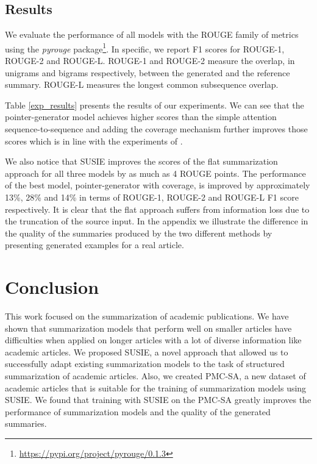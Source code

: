 \documentclass[runningheads]{llncs}
\begin{document}
\subsection{Results}

We evaluate the performance of all models with the ROUGE family of metrics~\cite{Lin2004Rouge:Summaries} using the {\em pyrouge} package\footnote{\url{https://pypi.org/project/pyrouge/0.1.3}}. In specific, we report F1 scores for ROUGE-1, ROUGE-2 and ROUGE-L. ROUGE-1 and ROUGE-2 measure the overlap, in unigrams and bigrams respectively, between the generated and the reference summary. ROUGE-L measures the longest common subsequence overlap.


Table \ref{exp_results} presents the results of our experiments. We can see that the pointer-generator model achieves higher scores than the simple attention sequence-to-sequence and adding the coverage mechanism further improves those scores which is in line with the experiments of \cite{See2017GetNetworks}. 

We also notice that SUSIE improves the scores of the flat summarization approach for all three models by as much as 4 ROUGE points. The performance of the best model, pointer-generator with coverage, is improved by approximately 13\%, 28\% and 14\% in terms of ROUGE-1, ROUGE-2 and ROUGE-L F1 score respectively. It is clear that the flat approach suffers from information loss due to the truncation of the source input.  
In the appendix we illustrate the difference in the quality of the summaries produced by the two different methods by presenting generated examples for a real article. 

\section{Conclusion}

This work focused on the summarization of academic publications. We have shown that summarization models that perform well on smaller articles have difficulties when applied on longer articles with a lot of diverse information like academic articles. We proposed SUSIE, a novel approach that allowed us to successfully adapt existing summarization models to the task of structured summarization of academic articles. Also, we created PMC-SA, a new dataset of academic articles that is suitable for the training of summarization models using SUSIE. We found that training with SUSIE on the PMC-SA greatly improves the performance of summarization models and the quality of the generated summaries. 
\end{document}
